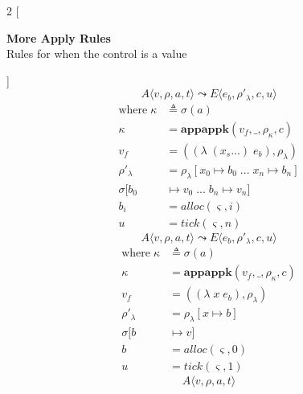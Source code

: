 \documentclass[12pt,draft]{article}
\newcommand{\lamsyn}[2]{(\lambda\;(#1 ...)\;#2)}
\newcommand{\vararglamsyn}[2]{(\lambda\;#1\;#2)}
\begin{document}

\begin{multicols*}{2}
[
\begin{center}
\textbf{More Apply Rules} \\
Rules for when the control is a value
\end{center}
]
\[
A\langle
v , \rho , a , t
\rangle
\leadsto
E\langle
e_b , \rho'_{\lambda} , c , u
\rangle
\]
\vspace{-14mm}
\begin{align*}
\text{where}\; \kappa &\triangleq \sigma(a) \\
\kappa &= \textbf{appappk}(v_f,\_, \rho_{\kappa}, c) \\
v_f &= (\lamsyn{x_s}{e_b}, \rho_{\lambda}) \\
\rho'_{\lambda} &= \rho_{\lambda}[x_0 \mapsto b_0\;...\; x_n \mapsto b_n] \\
\sigma[b_0 &\mapsto v_0\;...\; b_n \mapsto v_n] \\
b_i &= alloc(\varsigma, i) \\
u &= tick(\varsigma, n)
\end{align*}
\[
A\langle
v , \rho , a , t
\rangle
\leadsto
E\langle
e_b , \rho'_{\lambda} , c , u
\rangle
\]
\vspace{-10.5mm}
\begin{align*}
\text{where}\; \kappa &\triangleq \sigma(a) \\
\kappa &= \textbf{appappk}(v_f,\_, \rho_{\kappa}, c) \\
v_f &= (\vararglamsyn{x}{e_b}, \rho_{\lambda}) \\
\rho'_{\lambda} &= \rho_{\lambda}[x \mapsto b] \\
\sigma[b &\mapsto v] \\
b &= alloc(\varsigma, 0) \\
u &= tick(\varsigma, 1)
\end{align*}
\[
A\langle
v , \rho , a , t
\rangle
\]
\end{multicols*}
\end{document}
